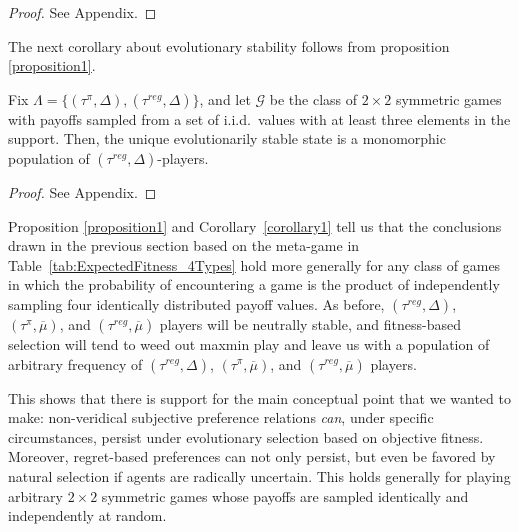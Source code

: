 \documentclass[fleqn,reqno,11pt]{article}
\begin{document}
\begin{proof}
See Appendix.
\end{proof}

\noindent The next corollary about evolutionary stability follows from proposition \ref{proposition1}.


\begin{corollary} \label{corollary1}

Fix $\Lambda = \lbrace (\tau^{\pi}, \Delta), (\tau^{reg}, \Delta) \rbrace$, and let $\mathcal{G}$ be the class
  of $2 \times 2$ symmetric games with payoffs sampled from a
  set of i.i.d.~values with at least three elements in the support. Then, the unique evolutionarily stable state is a monomorphic population of $(\tau^{reg}, \Delta)$-players.


\iffalse

  Fix $T = \lbrace \tau^{\pi}, \tau^{reg} \rbrace$,
  $E = \lbrace \Delta(A_{-i}), \overline{\mu} \rbrace$, $\Lambda= T \times E$, and
  $\mathcal{G}$ the class of symmetric $2 \times 2$ games with payoffs sampled from a finite,
  or compact and convex, set of i.i.d. values. Then, player type $(\tau^{\pi}, \Delta(A_{-i}))$
  is strictly dominated by $(\tau^{reg}, \Delta(A_{-i}))$, $(\tau^{\pi}, \overline{\mu})$, and
  $(\tau^{reg}, \overline{\mu})$.
\fi

\end{corollary}

\begin{proof}
See Appendix.
\end{proof}

Proposition \ref{proposition1} and Corollary~\ref{corollary1} tell us that the conclusions drawn in the previous section based on
the meta-game in Table~\ref{tab:ExpectedFitness_4Types} hold more generally for any class of
games in which the probability of encountering a game is the product of independently sampling
four identically distributed payoff values. As before,
$(\tau^{reg}, \Delta)$, $(\tau^{\pi}, \overline{\mu})$, and
$(\tau^{reg}, \overline{\mu})$ players will be neutrally stable, and fitness-based selection will tend
to weed out maxmin play and leave us with a population of arbitrary frequency of
$(\tau^{reg}, \Delta)$, $(\tau^{\pi}, \overline{\mu})$, and
$(\tau^{reg}, \overline{\mu})$ players.

This shows that there is support for the main conceptual point that we wanted to make:
non-veridical subjective preference relations \emph{can}, under specific circumstances, persist
under evolutionary selection based on objective fitness. Moreover, regret-based preferences can
not only persist, but even be favored by natural selection if agents are radically
uncertain. This holds generally for playing arbitrary $2 \times 2$ symmetric games whose payoffs are
sampled identically and independently at random.
\end{document}
